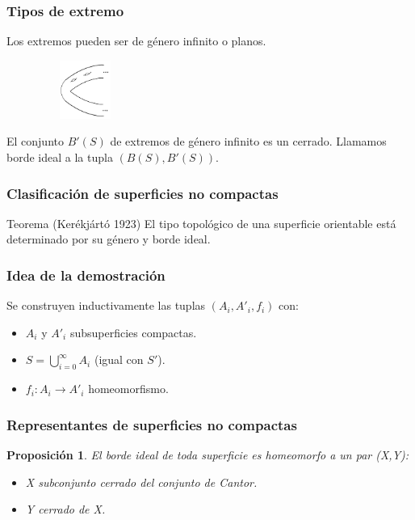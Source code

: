 \documentclass{beamer}
\newtheorem*{prop}{Proposición}
\begin{document}
\begin{frame}
\frametitle{Tipos de extremo}

Los extremos pueden ser de género infinito o planos.
\begin{figure}[htb]
\begin{center}
\includegraphics[width=1.2in,height=0.75in]{imagenes/dosfinales.png} 
\end{center}
\end{figure}

El conjunto $B'(S)$  de extremos de género infinito es un cerrado. Llamamos borde ideal a la tupla $(B(S), B'(S))$.
\end{frame}
 

\begin{frame}
\frametitle{Clasificación de superficies no compactas}

\begin{block}{Teorema (Kerékjártó 1923)}
El tipo topológico de una superficie orientable está determinado por su género y borde ideal.
\end{block}
\end{frame}

\begin{frame}

\frametitle{Idea de la demostración}
Se construyen inductivamente las tuplas $(A_i, A'_i, f_i)$ con:
\begin{itemize}
\item $A_i$ y $A'_i$  subsuperficies compactas.
\item $S = \bigcup_{i=0}^{\infty}A_i$  (igual con $S'$).
\item $f_i: A_i \longrightarrow A'_i$ homeomorfismo.
\end{itemize}

\end{frame}

\begin{frame}
\frametitle{Representantes de superficies no compactas}
\begin{prop}
El borde ideal de toda superficie es homeomorfo a un par (X,Y):
\begin{itemize}
\item X subconjunto cerrado del conjunto de Cantor.
\item Y cerrado de X.
\end{itemize} 
\end{prop}


\end{frame}
\end{document}
